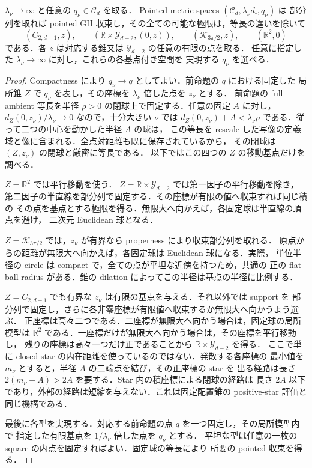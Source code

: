 \begin{proposition}[移動基点の全ての拡大極限]
\label{topo:cubical-moving-blowups}
$\lambda_\nu\to\infty$ と任意の $q_\nu\in\mathcal C_d$ を取る．
Pointed metric spaces $(\mathcal C_d,\lambda_\nu d_\square,q_\nu)$ は
部分列を取れば pointed GH 収束し，その全ての可能な極限は，等長の違いを除いて
\[
 (C_{2,d-1},z),\qquad
 (\mathbb R\times\mathcal Y_{d-2},(0,z)),\qquad
 (\mathcal K_{3\pi/2},z),\qquad
 (\mathbb R^2,0)
\]
である．各 $z$ は対応する錐又は $\mathcal Y_{d-2}$ の任意の有限の点を取る．
任意に指定した $\lambda_\nu\to\infty$ に対し，これらの各基点付き空間を
実現する $q_\nu$ を選べる．
\end{proposition}
\begin{proof}
Compactness により $q_\nu\to q$ としてよい．前命題の $q$ における固定した
局所錐 $Z$ で $q_\nu$ を表し，その座標を $\lambda_\nu$ 倍した点を $z_\nu$ とする．
前命題の full-ambient 等長を半径 $\rho>0$ の閉球上で固定する．任意の固定 $A$ に対し，
$d_Z(0,z_\nu)/\lambda_\nu\to0$ なので，十分大きい $\nu$ では
$d_Z(0,z_\nu)+A<\lambda_\nu\rho$ である．従って二つの中心を動かした半径 $A$ の球は，
この等長を rescale した写像の定義域と像に含まれる．全点対距離も既に保存されているから，
その閉球は $(Z,z_\nu)$ の閉球と厳密に等長である．
以下ではこの四つの $Z$ の移動基点だけを調べる．

$Z=\mathbb R^2$ では平行移動を使う．
$Z=\mathbb R\times\mathcal Y_{d-2}$ では第一因子の平行移動を除き，
第二因子の半直線を部分列で固定する．その座標が有限の値へ収束すれば同じ積の
その点を基点とする極限を得る．無限大へ向かえば，各固定球は半直線の頂点を避け，
二次元 Euclidean 球となる．

$Z=\mathcal K_{3\pi/2}$ では，$z_\nu$ が有界なら properness により収束部分列を取れる．
原点からの距離が無限大へ向かえば，各固定球は Euclidean 球になる．実際，
単位半径の circle は compact で，全ての点が平坦な近傍を持つため，共通の
正の flat-ball radius がある．錐の dilation によってこの半径は基点の半径に比例する．

$Z=C_{2,d-1}$ でも有界な $z_\nu$ は有限の基点を与える．それ以外では support を
部分列で固定し，さらに各非零座標が有限値へ収束するか無限大へ向かうよう選ぶ．
正座標は高々二つである．二座標が無限大へ向かう場合は，固定球の局所模型は
$\mathbb R^2$ である．一座標だけが無限大へ向かう場合は，その座標を平行移動し，
残りの座標は高々一つだけ正であることから
$\mathbb R\times\mathcal Y_{d-2}$ を得る．
ここで単に closed star の内在距離を使っているのではない．発散する各座標の
最小値を $m_\nu$ とすると，半径 $A$ の二端点を結び，その正座標の star を
出る経路は長さ $2(m_\nu-A)>2A$ を要する．Star 内の積座標による閉球の経路は
長さ $2A$ 以下であり，外部の経路は短縮を与えない．これは固定配置錐の
positive-star 評価\cite[\texttt{lem:star-ball-isometry}]{MultiscaleKECurrent}と同じ機構である．

最後に各型を実現する．対応する前命題の点 $q$ を一つ固定し，その局所模型内で
指定した有限基点を $1/\lambda_\nu$ 倍した点を $q_\nu$ とする．
平坦な型は任意の一枚の square の内点を固定すればよい．固定球の等長により
所要の pointed 収束を得る．
\end{proof}


